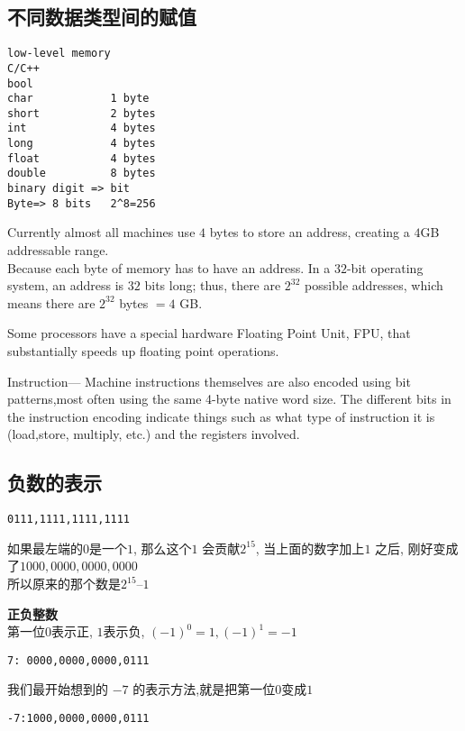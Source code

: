 \documentclass{article}
\begin{document}
\subsection{不同数据类型间的赋值}
\begin{verbatim}
low-level memory
C/C++
bool
char            1 byte
short           2 bytes
int             4 bytes
long            4 bytes
float           4 bytes
double        	8 bytes
binary digit => bit
Byte=> 8 bits   2^8=256
\end{verbatim}
Currently almost all machines use $4$ bytes to store an address, creating a $4$GB addressable range.\\
Because each byte of memory has to have an address. In a $32$-bit operating system, an address is $32$ bits long; thus, there are $2^{32}$ possible addresses, which means there are $2^{32}$ bytes $= 4$ GB.

Some processors have a special hardware Floating Point Unit, FPU, that substantially speeds up floating point operations.

Instruction— Machine instructions themselves are also encoded using bit patterns,most often using the same 4-byte native word size. The different bits in the instruction encoding indicate things such as what type of instruction it is (load,store, multiply, etc.) and the registers involved.

\subsection{负数的表示}
\begin{verbatim}
0111,1111,1111,1111
\end{verbatim}
如果最左端的$0$是一个$1$, 那么这个$1$ 会贡献$2^{15}$, 当上面的数字加上$1$ 之后, 刚好变成了$1000,0000,0000,0000$\\
所以原来的那个数是$2^{15} – 1$

\textbf{正负整数}\\
第一位$0$表示正, $1$表示负, $(-1)^0=1, (-1)^1 = -1$
\begin{verbatim}
7: 0000,0000,0000,0111
\end{verbatim}
我们最开始想到的 $-7$ 的表示方法,就是把第一位$0$变成$1$
\begin{verbatim}
-7:1000,0000,0000,0111
\end{verbatim}
\end{document}
